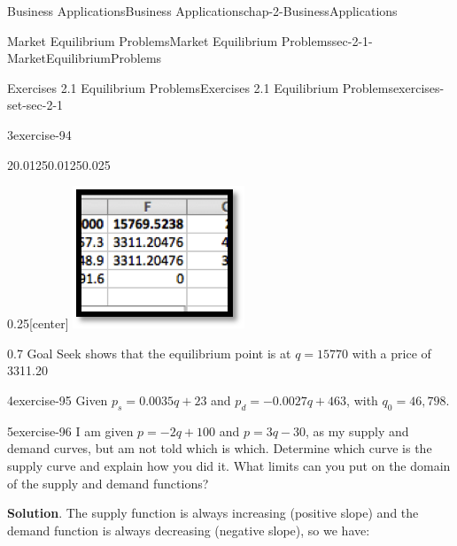 \documentclass[oneside,10pt,]{book}
\numberwithin{equation}{section}
\begin{document}
\begin{chapterptx}{Business Applications}{}{Business Applications}{}{}{chap-2-BusinessApplications}
\begin{sectionptx}{Market Equilibrium Problems}{}{Market Equilibrium Problems}{}{}{sec-2-1-MarketEquilibriumProblems}
\begin{exercises-subsection-numberless}{Exercises 2.1 Equilibrium Problems}{}{Exercises 2.1 Equilibrium Problems}{}{}{exercises-set-sec-2-1}
\begin{exercisegroup}
\begin{divisionexerciseeg}{3}{}{}{exercise-94}
\begin{enumerate}[label=(\alph*)]
\begin{sidebyside}{2}{0.0125}{0.0125}{0.025}
\begin{sbspanel}{0.25}[center]
\includegraphics[width=1\linewidth]{images/sec2-1-sol3d.png}
\end{sbspanel}%
\begin{sbspanel}{0.7}%
\hypertarget{p-599}{}%
Goal Seek shows that the equilibrium point is at \(q = 15770\) with a price of \textdollar{}3311.20%
\end{sbspanel}%
\end{sidebyside}%
\end{enumerate}
\end{divisionexerciseeg}%
\begin{divisionexerciseeg}{4}{}{}{exercise-95}%
\hypertarget{p-600}{}%
Given \(p_s=0.0035 q+23\) and \(p_d=-0.0027 q+463\), with \(q_0=46,798\).%
\end{divisionexerciseeg}%
\end{exercisegroup}
\par\medskip\noindent
\begin{divisionexercise}{5}{}{}{exercise-96}%
\hypertarget{p-601}{}%
I am given \(p=-2 q+100\) and \(p=3 q-30\), as my supply and demand curves, but am not told which is which.  Determine which curve is the supply curve and explain how you did it.  What limits can you put on the domain of the supply and demand functions?%
\par\smallskip%
\noindent\textbf{Solution}.\hypertarget{solution-46}{}\quad%
\hypertarget{p-602}{}%
The supply function is always increasing (positive slope) and the demand function is always decreasing (negative slope), so we have:%
%
\begin{equation*}

\end{equation*}
\end{divisionexercise}
\end{exercises-subsection-numberless}
\end{sectionptx}
\end{chapterptx}
\end{document}
